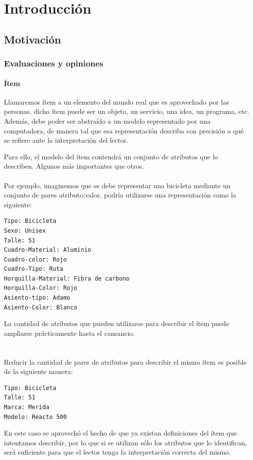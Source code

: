 \part{Introducción}

\chapter{Motivación}
\label{chapter:introduccion}

\section{Evaluaciones y opiniones}
\label{section:evaluaciones-cruzadas}

\subsection{Ítem}
\noindent Llamaremos ítem a un elemento del mundo real que es aprovechado por las personas, dicho ítem puede ser un objeto, un servicio, una idea, un programa, etc. Además, debe poder ser abstraído a un modelo representado por una computadora, de manera tal que esa representación describa con precisión a qué se refiere ante la interpretación del lector. 

\noindent Para ello, el modelo del ítem contendrá un conjunto de atributos que lo describen. Algunos más importantes que otros.
\\\\
Por ejemplo, imaginemos que se debe representar una bicicleta mediante un conjunto de pares atributo;valor, podría utilizarse una representación como la siguiente:
\begin{lstlisting}[frame=single] 
Tipo: Bicicleta
Sexo: Unisex
Talle: 51
Cuadro-Material: Aluminio
Cuadro-color: Rojo
Cuadro-Tipo: Ruta
Horquilla-Material: Fibra de carbono
Horquilla-Color: Rojo
Asiento-tipo: Adamo 
Asiento-Color: Blanco
\end{lstlisting}
La cantidad de atributos que pueden utilizarse para describir el ítem puede ampliarse prácticamente hasta el cansancio. 
\\\\\\
Reducir la cantidad de pares de atributos para describir el mismo ítem es posible de la siguiente manera: 
\begin{lstlisting}[frame=single] 
Tipo: Bicicleta
Talle: 51 
Marca: Merida
Modelo: Reacto 500
\end{lstlisting}
En este caso se aprovechó el hecho de que ya existan definiciones del ítem que intentamos describir, por lo que si se utilizan sólo los atributos que lo identifican, será suficiente para que el lector tenga la interpretación correcta del mismo. 
\\\\
